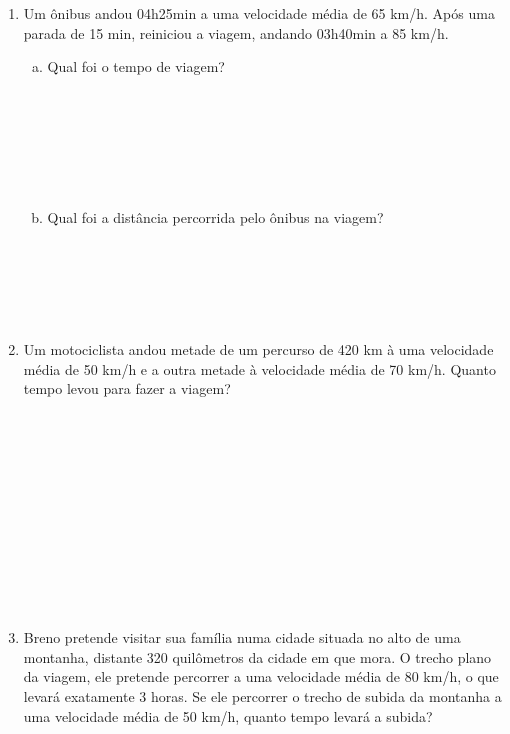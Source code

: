 \documentclass[a4paper,14pt]{article}
\begin{document}
\begin{multicols}{2}
\begin{enumerate}
    	    \item Um ônibus andou 04h25min a uma velocidade média de 65 km/h. Após uma parada de 15 min, reiniciou a viagem, andando 03h40min a 85 km/h.
    	    \begin{enumerate}[a)]
    	    	\item Qual foi o tempo de viagem? \\\\\\\\\\\\\\
    	    	\item Qual foi a distância percorrida pelo ônibus na viagem? \\\\\\\\\\\\
    	    \end{enumerate}
            \item Um motociclista andou metade de um percurso de 420 km à uma velocidade média de 50 km/h e a outra metade à velocidade média de 70 km/h. Quanto tempo levou para fazer a viagem? \\\\\\\\\\\\\\\\\\\\\\\\
            \item Breno pretende visitar sua família numa cidade situada no alto de uma montanha, distante 320 quilômetros da cidade em que mora. O trecho plano da viagem, ele pretende percorrer a uma velocidade média de 80 km/h, o que levará exatamente 3 horas. Se ele percorrer o trecho de subida da montanha a uma velocidade média de 50 km/h, quanto tempo levará a subida? \\\\\\\\\\\\\\\\\\\\

\end{enumerate}
\end{multicols}
\end{document}
